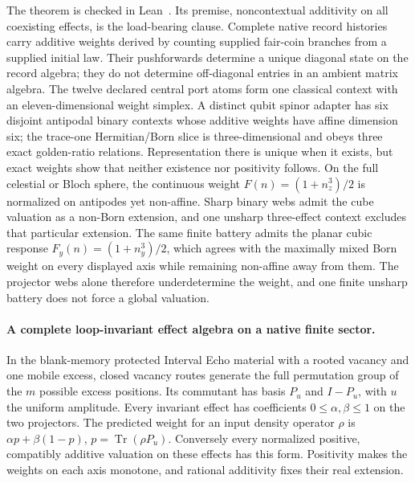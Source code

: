 \documentclass[11pt]{article}
\begin{document}
The theorem is checked in Lean~\cite{ophrepo}. Its premise, noncontextual
additivity on all coexisting effects, is the load-bearing clause. Complete
native record histories carry additive weights derived by counting supplied
fair-coin branches from a supplied initial law. Their pushforwards determine a unique diagonal state on the record algebra;
they do not determine off-diagonal entries in an ambient matrix algebra.
The twelve declared central
port atoms form one classical context with an eleven-dimensional weight
simplex. A distinct qubit spinor adapter has six disjoint antipodal binary
contexts whose additive weights have affine dimension six; the trace-one
Hermitian/Born slice is three-dimensional and obeys three exact golden-ratio
relations. Representation there is unique when it exists, but exact weights
show that neither existence nor positivity follows. On the full celestial or
Bloch sphere, the continuous weight \(F(n)=(1+n_z^3)/2\) is normalized on
antipodes yet non-affine. Sharp binary webs admit the cube valuation as a
non-Born extension, and one unsharp three-effect context excludes that
particular extension. The same finite battery admits the planar cubic
response \(F_y(n)=(1+n_y^3)/2\), which agrees with the maximally mixed Born
weight on every displayed axis while remaining non-affine away from them. The
projector webs alone therefore underdetermine the weight, and one finite
unsharp battery does not force a global valuation.

\paragraph{A complete loop-invariant effect algebra on a native finite sector.}
In the blank-memory protected Interval Echo material with a rooted vacancy
and one mobile excess, closed vacancy routes generate the full permutation
group of the \(m\) possible excess positions. Its commutant has basis
\(P_u\) and \(I-P_u\), with \(u\) the uniform amplitude. Every invariant
effect has coefficients \(0\le\alpha,\beta\le1\) on the two projectors.
The predicted weight for an input density operator \(\rho\) is
\(\alpha p+\beta(1-p)\), \(p=\operatorname{Tr}(\rho P_u)\).
Conversely every normalized positive, compatibly additive valuation on
these effects has this form. Positivity makes the weights on each axis
monotone, and rational additivity fixes their real extension.
\end{document}
